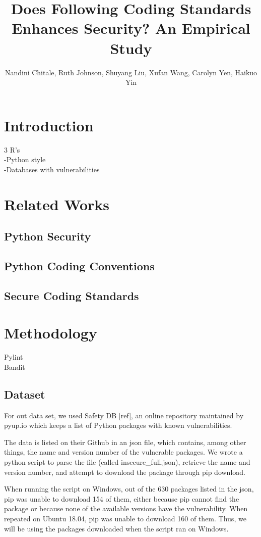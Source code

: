 \documentclass[sigconf]{acmart}
\title{Does Following Coding Standards Enhances Security? An Empirical Study}
\author{Nandini Chitale, Ruth Johnson, Shuyang Liu, Xufan Wang, Carolyn Yen, Haikuo Yin}
\begin{document}
\maketitle

\begin{abstract}
      
\end{abstract}
\section{Introduction}
3 R's\\
-Python style\\
-Databases with vulnerabilities\\
\section{Related Works}
\subsection{Python Security}
\subsection{Python Coding Conventions}
\subsection{Secure Coding Standards}
\section{Methodology}
Pylint\\
Bandit\\
\subsection{Dataset}
For out data set, we used Safety DB [ref], an online repository maintained by pyup.io which keeps a list of Python packages with known vulnerabilities. 

The data is listed on their Github in an json file, which contains, among other things, the name and version number of the vulnerable packages. We wrote a python script to parse the file (called insecure\_full.json), retrieve the name and version number, and attempt to download the package through pip download.

When running the script on Windows, out of the 630 packages listed in the json, pip was unable to download 154 of them, either because pip cannot find the package or because none of the available versions have the vulnerability. When repeated on Ubuntu 18.04, pip was unable to download 160 of them. Thus, we will be using the packages downloaded when the script ran on Windows.
\end{document}
